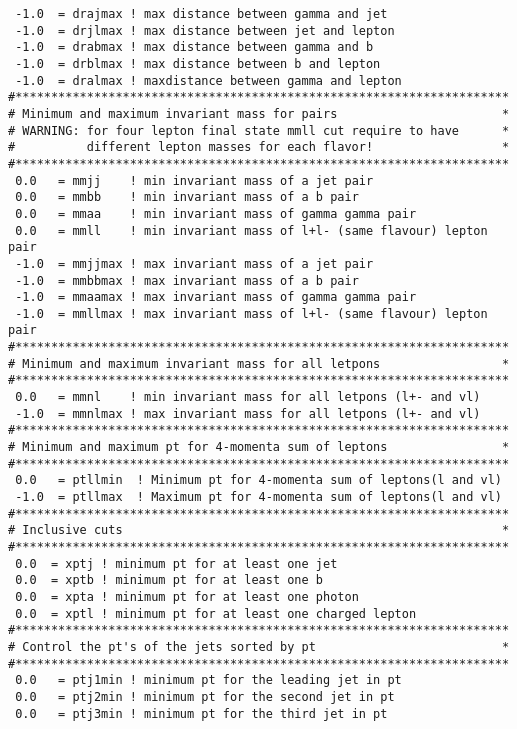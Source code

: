 \begin{enumerate}
\begin{lstlisting}
 -1.0  = drajmax ! max distance between gamma and jet
 -1.0  = drjlmax ! max distance between jet and lepton
 -1.0  = drabmax ! max distance between gamma and b
 -1.0  = drblmax ! max distance between b and lepton
 -1.0  = dralmax ! maxdistance between gamma and lepton
#*********************************************************************
# Minimum and maximum invariant mass for pairs                       *
# WARNING: for four lepton final state mmll cut require to have      *
#          different lepton masses for each flavor!                  *           
#*********************************************************************
 0.0   = mmjj    ! min invariant mass of a jet pair 
 0.0   = mmbb    ! min invariant mass of a b pair 
 0.0   = mmaa    ! min invariant mass of gamma gamma pair
 0.0   = mmll    ! min invariant mass of l+l- (same flavour) lepton pair
 -1.0  = mmjjmax ! max invariant mass of a jet pair
 -1.0  = mmbbmax ! max invariant mass of a b pair
 -1.0  = mmaamax ! max invariant mass of gamma gamma pair
 -1.0  = mmllmax ! max invariant mass of l+l- (same flavour) lepton pair
#*********************************************************************
# Minimum and maximum invariant mass for all letpons                 *
#*********************************************************************
 0.0   = mmnl    ! min invariant mass for all letpons (l+- and vl) 
 -1.0  = mmnlmax ! max invariant mass for all letpons (l+- and vl) 
#*********************************************************************
# Minimum and maximum pt for 4-momenta sum of leptons                *
#*********************************************************************
 0.0   = ptllmin  ! Minimum pt for 4-momenta sum of leptons(l and vl)
 -1.0  = ptllmax  ! Maximum pt for 4-momenta sum of leptons(l and vl)
#*********************************************************************
# Inclusive cuts                                                     *
#*********************************************************************
 0.0  = xptj ! minimum pt for at least one jet  
 0.0  = xptb ! minimum pt for at least one b 
 0.0  = xpta ! minimum pt for at least one photon 
 0.0  = xptl ! minimum pt for at least one charged lepton 
#*********************************************************************
# Control the pt's of the jets sorted by pt                          *
#*********************************************************************
 0.0   = ptj1min ! minimum pt for the leading jet in pt
 0.0   = ptj2min ! minimum pt for the second jet in pt
 0.0   = ptj3min ! minimum pt for the third jet in pt

\end{lstlisting}
\end{enumerate}

